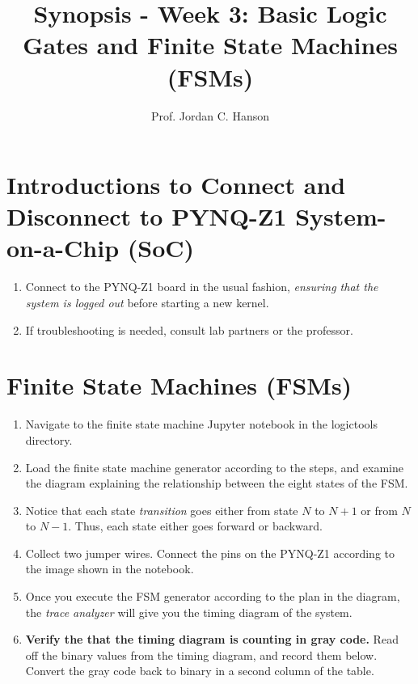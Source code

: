 \documentclass{article}
\begin{document}
\title{Synopsis - Week 3: Basic Logic Gates and Finite State Machines (FSMs)}
\author{Prof. Jordan C. Hanson}

\maketitle

\section{Introductions to Connect and Disconnect to PYNQ-Z1 System-on-a-Chip (SoC)}

\begin{enumerate}
\item Connect to the PYNQ-Z1 board in the usual fashion,\textit{ ensuring that the system is logged out} before starting a new kernel.
\item If troubleshooting is needed, consult lab partners or the professor.
\end{enumerate}

\section{Finite State Machines (FSMs)}

\begin{enumerate}
\item Navigate to the finite state machine Jupyter notebook in the logictools directory.
\item Load the finite state machine generator according to the steps, and examine the diagram explaining the relationship between the eight states of the FSM.
\item Notice that each state \textit{transition} goes either from state $N$ to $N+1$ or from $N$ to $N-1$.  Thus, each state either goes forward or backward.
\item Collect two jumper wires.  Connect the pins on the PYNQ-Z1 according to the image shown in the notebook.
\item Once you execute the FSM generator according to the plan in the diagram, the \textit{trace analyzer} will give you the timing diagram of the system.
\item \textbf{Verify the that the timing diagram is counting in gray code.}  Read off the binary values from the timing diagram, and record them below.  Convert the gray code back to binary in a second column of the table. \\ \vspace{2cm}
\end{enumerate}
\end{document}
